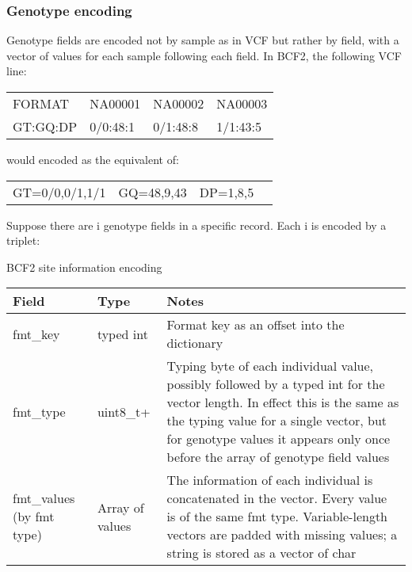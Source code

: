 \documentclass[8pt]{article}
\begin{document}
\subsubsection{Genotype encoding}

Genotype fields are encoded not by sample as in VCF but rather by field, with a vector of values for each sample following each field.  In BCF2, the following VCF line:

\vspace{0.3cm}
\begin{tabular}{l l l l}
FORMAT & NA00001 & NA00002 & NA00003 \\
GT:GQ:DP & 0/0:48:1 & 0/1:48:8 & 1/1:43:5 \\
\end{tabular}
\vspace{0.3cm}

would encoded as the equivalent of:

\vspace{0.3cm}
\begin{tabular}{l l l l}
GT=0/0,0/1,1/1 & GQ=48,9,43 & DP=1,8,5
\end{tabular}
\vspace{0.3cm}

Suppose there are i genotype fields in a specific record.  Each i is encoded by a triplet:

BCF2 site information encoding

\vspace{0.3cm}
\small
\begin{tabular}{ | p{2cm} | p{2.5cm} | p{9.5cm} | } \hline
Field & Type & Notes \\ \hline
fmt\_key & typed int & Format key as an offset into the dictionary \\ \hline
fmt\_type & uint8\_t+ & Typing byte of each individual value, possibly followed by a typed int for the vector length.  In effect this is the same as the typing value for a single vector, but for genotype values it appears only once before the array of genotype field values \\ \hline
fmt\_values	(by fmt type) & Array of values & The information of each individual is concatenated in the vector.  Every value is of the same fmt type.  Variable-length vectors are padded with missing values; a string is stored as a vector of char \\  \hline
\end{tabular}
\normalsize
\vspace{0.3cm}
\end{document}
